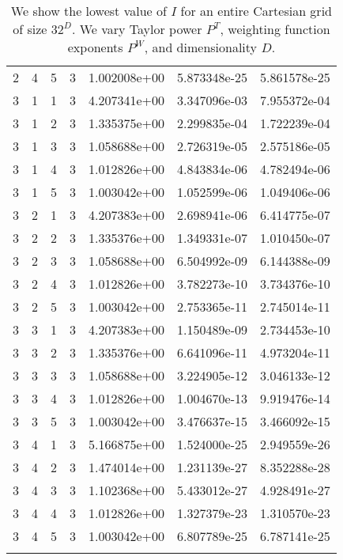 \documentclass{article}
\begin{document}
\begin{table}
\begin{center}
\begin{tabular}{|cccc|ccc|}
2 & 4 & 5 & 3 & 1.002008e+00 & 5.873348e-25 & 5.861578e-25 \\ 
3 & 1 & 1 & 3 & 4.207341e+00 & 3.347096e-03 & 7.955372e-04 \\ 
3 & 1 & 2 & 3 & 1.335375e+00 & 2.299835e-04 & 1.722239e-04 \\ 
3 & 1 & 3 & 3 & 1.058688e+00 & 2.726319e-05 & 2.575186e-05 \\ 
3 & 1 & 4 & 3 & 1.012826e+00 & 4.843834e-06 & 4.782494e-06 \\ 
3 & 1 & 5 & 3 & 1.003042e+00 & 1.052599e-06 & 1.049406e-06 \\ 
3 & 2 & 1 & 3 & 4.207383e+00 & 2.698941e-06 & 6.414775e-07 \\ 
3 & 2 & 2 & 3 & 1.335376e+00 & 1.349331e-07 & 1.010450e-07 \\ 
3 & 2 & 3 & 3 & 1.058688e+00 & 6.504992e-09 & 6.144388e-09 \\ 
3 & 2 & 4 & 3 & 1.012826e+00 & 3.782273e-10 & 3.734376e-10 \\ 
3 & 2 & 5 & 3 & 1.003042e+00 & 2.753365e-11 & 2.745014e-11 \\ 
3 & 3 & 1 & 3 & 4.207383e+00 & 1.150489e-09 & 2.734453e-10 \\ 
3 & 3 & 2 & 3 & 1.335376e+00 & 6.641096e-11 & 4.973204e-11 \\ 
3 & 3 & 3 & 3 & 1.058688e+00 & 3.224905e-12 & 3.046133e-12 \\ 
3 & 3 & 4 & 3 & 1.012826e+00 & 1.004670e-13 & 9.919476e-14 \\ 
3 & 3 & 5 & 3 & 1.003042e+00 & 3.476637e-15 & 3.466092e-15 \\ 
3 & 4 & 1 & 3 & 5.166875e+00 & 1.524000e-25 & 2.949559e-26 \\ 
3 & 4 & 2 & 3 & 1.474014e+00 & 1.231139e-27 & 8.352288e-28 \\ 
3 & 4 & 3 & 3 & 1.102368e+00 & 5.433012e-27 & 4.928491e-27 \\ 
3 & 4 & 4 & 3 & 1.012826e+00 & 1.327379e-23 & 1.310570e-23 \\ 
3 & 4 & 5 & 3 & 1.003042e+00 & 6.807789e-25 & 6.787141e-25 \\ 
\hline
\label{tab::worst_all_reg_inv_conv}
\end{tabular}
\end{center}
\caption
    {
      We show the lowest value of
      $I$ for an entire Cartesian grid of size $32^D$.
      We vary Taylor power $P^T$, weighting
      function exponents $P^W$, and dimensionality $D$. 
    }
\end{table}
\end{document}

